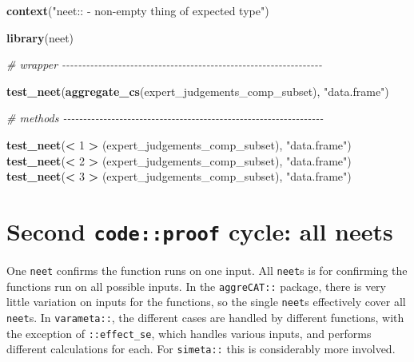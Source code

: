 \documentclass[
]{article}
\newenvironment{Shaded}{\begin{snugshade}}{\end{snugshade}}
\newcommand{\CommentTok}[1]{\textcolor[rgb]{0.56,0.35,0.01}{\textit{#1}}}
\newcommand{\DecValTok}[1]{\textcolor[rgb]{0.00,0.00,0.81}{#1}}
\newcommand{\KeywordTok}[1]{\textcolor[rgb]{0.13,0.29,0.53}{\textbf{#1}}}
\newcommand{\NormalTok}[1]{#1}
\newcommand{\OperatorTok}[1]{\textcolor[rgb]{0.81,0.36,0.00}{\textbf{#1}}}
\newcommand{\StringTok}[1]{\textcolor[rgb]{0.31,0.60,0.02}{#1}}
\begin{document}
\begin{Shaded}
\begin{Highlighting}[]
\KeywordTok{context}\NormalTok{(}\StringTok{"neet:: {-} non{-}empty thing of expected type"}\NormalTok{)}

\KeywordTok{library}\NormalTok{(neet)}


\CommentTok{\# wrapper {-}{-}{-}{-}{-}{-}{-}{-}{-}{-}{-}{-}{-}{-}{-}{-}{-}{-}{-}{-}{-}{-}{-}{-}{-}{-}{-}{-}{-}{-}{-}{-}{-}{-}{-}{-}{-}{-}{-}{-}{-}{-}{-}{-}{-}{-}{-}{-}{-}{-}{-}{-}{-}{-}{-}{-}{-}{-}{-}{-}{-}{-}{-}{-}{-}}

\KeywordTok{test\_neet}\NormalTok{(}\KeywordTok{aggregate\_cs}\NormalTok{(expert\_judgements\_comp\_subset), }\StringTok{"data.frame"}\NormalTok{)}

\CommentTok{\# methods {-}{-}{-}{-}{-}{-}{-}{-}{-}{-}{-}{-}{-}{-}{-}{-}{-}{-}{-}{-}{-}{-}{-}{-}{-}{-}{-}{-}{-}{-}{-}{-}{-}{-}{-}{-}{-}{-}{-}{-}{-}{-}{-}{-}{-}{-}{-}{-}{-}{-}{-}{-}{-}{-}{-}{-}{-}{-}{-}{-}{-}{-}{-}{-}{-}}

\KeywordTok{test\_neet}\NormalTok{(}\OperatorTok{<}\StringTok{ }\DecValTok{1} \OperatorTok{>}\StringTok{ }\NormalTok{(expert\_judgements\_comp\_subset), }\StringTok{"data.frame"}\NormalTok{)}
\KeywordTok{test\_neet}\NormalTok{(}\OperatorTok{<}\StringTok{ }\DecValTok{2} \OperatorTok{>}\StringTok{ }\NormalTok{(expert\_judgements\_comp\_subset), }\StringTok{"data.frame"}\NormalTok{)}
\KeywordTok{test\_neet}\NormalTok{(}\OperatorTok{<}\StringTok{ }\DecValTok{3} \OperatorTok{>}\StringTok{ }\NormalTok{(expert\_judgements\_comp\_subset), }\StringTok{"data.frame"}\NormalTok{)}
\end{Highlighting}
\end{Shaded}

\hypertarget{second-codeproof-cycle-all-neets}{%
\section{\texorpdfstring{Second \texttt{code::proof} cycle: all neets}{Second code::proof cycle: all neets}}\label{second-codeproof-cycle-all-neets}}

One \texttt{neet} confirms the function runs on one input. All \texttt{neet}s is for confirming the functions run on all possible inputs. In the \texttt{aggreCAT::} package, there is very little variation on inputs for the functions, so the single \texttt{neet}s effectively cover all \texttt{neet}s. In \texttt{varameta::}, the different cases are handled by different functions, with the exception of \texttt{::effect\_se}, which handles various inputs, and performs different calculations for each. For \texttt{simeta::} this is considerably more involved.
\end{document}
